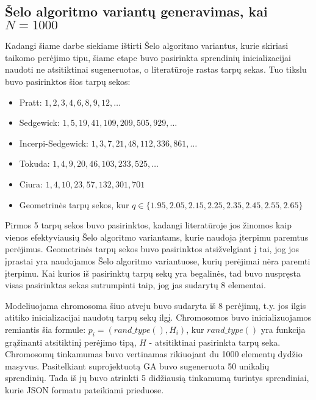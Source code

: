 \documentclass{VUMIFInfKursinis}
\begin{document}
\subsection{Šelo algoritmo variantų generavimas, kai $N = 1000$}

Kadangi šiame darbe siekiame ištirti Šelo algoritmo variantus, kurie skiriasi taikomo perėjimo tipu,
šiame etape buvo pasirinkta sprendinių inicializacijai naudoti ne atsitiktinai sugeneruotas, o literatūroje rastas tarpų sekas.
Tuo tikslu buvo pasirinktos šios tarpų sekos:
\begin{itemize}
  \item Pratt: $1, 2, 3, 4, 6, 8, 9, 12, \ldots$ \cite{pratt1972shellsort}
  \item Sedgewick: $1, 5, 19, 41, 109, 209, 505, 929, \ldots$ \cite{SEDGEWICK1986159}
  \item Incerpi-Sedgewick: $1, 3, 7, 21, 48, 112, 336, 861, \ldots$ \cite{incerpi1985improved}
  \item Tokuda: $1, 4, 9, 20, 46, 103, 233, 525, \ldots $ \cite{10.5555/645569.659879}
  \item Ciura: $1, 4, 10, 23, 57, 132, 301, 701$ \cite{ciura2001best}
  \item Geometrinės tarpų sekos, kur $ q \in \{1.95, 2.05, 2.15, 2.25, 2.35, 2.45, 2.55, 2.65 \}$ \cite{Radavičius_Baranauskas_2013}
\end{itemize}
Pirmos 5 tarpų sekos buvo pasirinktos, kadangi literatūroje jos žinomos kaip vienos efektyviausių
Šelo algoritmo variantams, kurie naudoja įterpimu paremtus perėjimus.
Geometrinės tarpų sekos buvo pasirinktos atsižvelgiant į tai, jog jos įprastai yra naudojamos
Šelo algoritmo variantuose, kurių perėjimai nėra paremti įterpimu.
Kai kurios iš pasirinktų tarpų sekų yra begalinės, tad buvo nuspręsta visas pasirinktas sekas sutrumpinti taip, jog jas sudarytų 8 elementai.

Modeliuojama chromosoma šiuo atveju buvo sudaryta iš 8 perėjimų, t.y. jos ilgis atitiko
inicializacijai naudotų tarpų sekų ilgį.
Chromosomos buvo inicializuojamos remiantis šia formule:
$p_i = (rand\_type(), H_i)$, kur $rand\_type()$ yra funkcija grąžinanti atsitiktinį perėjimo tipą, $H$ - atsitiktinai pasirinkta tarpų seka.
Chromosomų tinkamumas buvo vertinamas rikiuojant du 1000 elementų dydžio masyvus.
Pasitelkiant suprojektuotą GA buvo sugeneruota 50 unikalių sprendinių.
Tada iš jų buvo atrinkti 5 didžiausią tinkamumą turintys sprendiniai, kurie JSON formatu pateikiami prieduose. %
\end{document}

